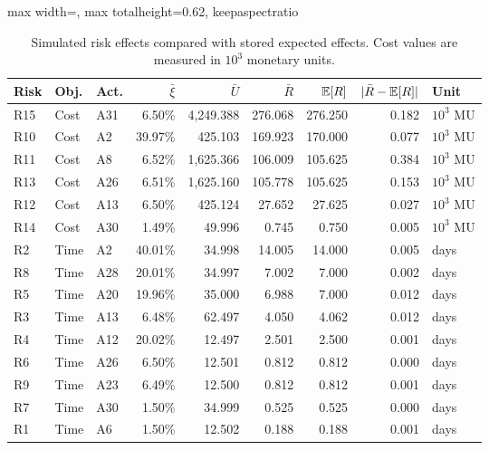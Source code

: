 \begin{table}[H]
\centering
\caption{Simulated risk effects compared with stored expected effects. Cost values are measured in $10^3$ monetary units.}
\label{tab:risk-effect-summary}
\scriptsize
\setlength{\tabcolsep}{2.5pt}
\renewcommand{\arraystretch}{0.92}
\begin{adjustbox}{max width=\textwidth, max totalheight=0.62\textheight, keepaspectratio}
\begin{tabular}{@{}lllrrrrrl@{}}
\toprule
Risk & Obj. & Act. & $\bar\xi$ & $\bar U$ & $\bar R$ & $\mathbb{E}[R]$ & $|\bar R-\mathbb{E}[R]|$ & Unit \\
\midrule
R15 & Cost & A31 & 6.50\% & 4,249.388 & 276.068 & 276.250 & 0.182 & $10^3$ MU \\
R10 & Cost & A2 & 39.97\% & 425.103 & 169.923 & 170.000 & 0.077 & $10^3$ MU \\
R11 & Cost & A8 & 6.52\% & 1,625.366 & 106.009 & 105.625 & 0.384 & $10^3$ MU \\
R13 & Cost & A26 & 6.51\% & 1,625.160 & 105.778 & 105.625 & 0.153 & $10^3$ MU \\
R12 & Cost & A13 & 6.50\% & 425.124 & 27.652 & 27.625 & 0.027 & $10^3$ MU \\
R14 & Cost & A30 & 1.49\% & 49.996 & 0.745 & 0.750 & 0.005 & $10^3$ MU \\
R2 & Time & A2 & 40.01\% & 34.998 & 14.005 & 14.000 & 0.005 & days \\
R8 & Time & A28 & 20.01\% & 34.997 & 7.002 & 7.000 & 0.002 & days \\
R5 & Time & A20 & 19.96\% & 35.000 & 6.988 & 7.000 & 0.012 & days \\
R3 & Time & A13 & 6.48\% & 62.497 & 4.050 & 4.062 & 0.012 & days \\
R4 & Time & A12 & 20.02\% & 12.497 & 2.501 & 2.500 & 0.001 & days \\
R6 & Time & A26 & 6.50\% & 12.501 & 0.812 & 0.812 & 0.000 & days \\
R9 & Time & A23 & 6.49\% & 12.500 & 0.812 & 0.812 & 0.001 & days \\
R7 & Time & A30 & 1.50\% & 34.999 & 0.525 & 0.525 & 0.000 & days \\
R1 & Time & A6 & 1.50\% & 12.502 & 0.188 & 0.188 & 0.001 & days \\
\bottomrule
\end{tabular}
\end{adjustbox}
\end{table}
